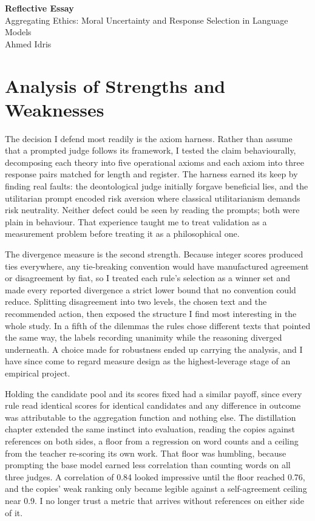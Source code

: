 \documentclass[11pt,a4paper]{article}
\begin{document}
\begin{center}
{\large\textbf{Reflective Essay}}\\[2pt]
Aggregating Ethics: Moral Uncertainty and Response Selection in Language Models\\[2pt]
Ahmed Idris
\end{center}

\section*{Analysis of Strengths and Weaknesses}

The decision I defend most readily is the axiom harness. Rather than assume that a prompted judge follows its framework, I tested the claim behaviourally, decomposing each theory into five operational axioms and each axiom into three response pairs matched for length and register. The harness earned its keep by finding real faults: the deontological judge initially forgave beneficial lies, and the utilitarian prompt encoded risk aversion where classical utilitarianism demands risk neutrality. Neither defect could be seen by reading the prompts; both were plain in behaviour. That experience taught me to treat validation as a measurement problem before treating it as a philosophical one.

The divergence measure is the second strength. Because integer scores produced ties everywhere, any tie-breaking convention would have manufactured agreement or disagreement by fiat, so I treated each rule's selection as a winner set and made every reported divergence a strict lower bound that no convention could reduce. Splitting disagreement into two levels, the chosen text and the recommended action, then exposed the structure I find most interesting in the whole study. In a fifth of the dilemmas the rules chose different texts that pointed the same way, the labels recording unanimity while the reasoning diverged underneath. A choice made for robustness ended up carrying the analysis, and I have since come to regard measure design as the highest-leverage stage of an empirical project.

Holding the candidate pool and its scores fixed had a similar payoff, since every rule read identical scores for identical candidates and any difference in outcome was attributable to the aggregation function and nothing else. The distillation chapter extended the same instinct into evaluation, reading the copies against references on both sides, a floor from a regression on word counts and a ceiling from the teacher re-scoring its own work. That floor was humbling, because prompting the base model earned less correlation than counting words on all three judges. A correlation of 0.84 looked impressive until the floor reached 0.76, and the copies' weak ranking only became legible against a self-agreement ceiling near 0.9. I no longer trust a metric that arrives without references on either side of it.
\end{document}
